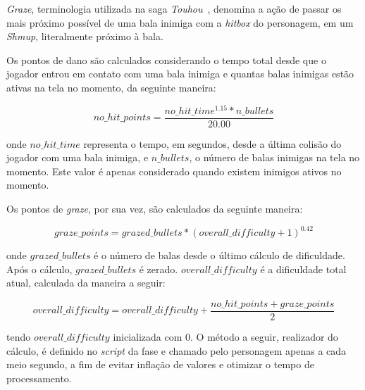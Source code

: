 \textit{Graze}, terminologia utilizada na saga \textit{Touhou}~\citep{Touhou}, denomina a ação de passar os mais próximo possível de uma bala inimiga com a \textit{hitbox} do personagem, em um \textit{Shmup}, literalmente \textquotedbl{} próximo à bala.

Os pontos de dano são calculados considerando o tempo total desde que o jogador entrou em contato com uma bala inimiga e quantas balas inimigas estão ativas na tela no momento, da seguinte maneira:

$$
no\_hit\_points = \frac{no\_hit\_time^{1.15} * n\_bullets}{20.00}
$$

onde $no\_hit\_time$ representa o tempo, em segundos, desde a última colisão do jogador com uma bala inimiga, e $n\_bullets$, o número de balas inimigas na tela no momento. Este valor é apenas considerado quando existem inimigos ativos no momento.

Os pontos de \textit{graze}, por sua vez, são calculados da seguinte maneira:

$$
graze\_points = grazed\_bullets * (overall\_difficulty + 1)^{0.42}
$$

onde $grazed\_bullets$ é o número de balas \textquotedbl{} desde o último cálculo de dificuldade. Após o cálculo, $grazed\_bullets$ é zerado. $overall\_difficulty$ é a dificuldade total atual, calculada da maneira a seguir:

$$
overall\_difficulty = overall\_difficulty + \frac{no\_hit\_points + graze\_points}{2}
$$\label{overallDiffCalc}

tendo $overall\_difficulty$ inicializada com 0. O método a seguir, realizador do cálculo, é definido no \textit{script} da fase e chamado pelo personagem apenas a cada meio segundo, a fim de evitar inflação de valores e otimizar o tempo de processamento.

